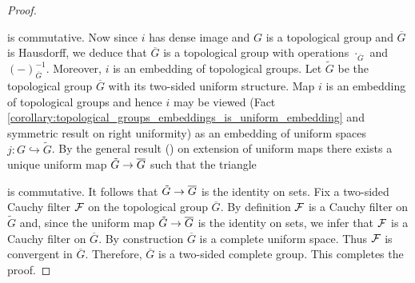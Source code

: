 \documentclass[10pt]{amsart}
\begin{document}
\begin{proof}
\begin{center}
	\end{center}
	is commutative. Now since $i$ has dense image and $G$ is a topological group and $\overline{G}$ is Hausdorff, we deduce that $\overline{G}$ is a topological group with operations $\cdot_{\overline{G}}$ and $(-)^{-1}_{\overline{G}}$. Moreover, $i$ is an embedding of topological groups. Let $\tilde{G}$ be the topological group $\overline{G}$ with its two-sided uniform structure. Map $i$ is an embedding of topological groups and hence $i$ may be viewed (Fact \ref{corollary:topological_groups_embeddings_is_uniform_embedding} and symmetric result on right uniformity) as an embedding of uniform spaces $j:G\hookrightarrow \tilde{G}$. By the general result (\cite{Uniform_Spaces}) on extension of uniform maps there exists a unique uniform map $\tilde{G} \rightarrow \overline{G}$ such that the triangle
	\begin{center}
	\end{center}
	is commutative. It follows that $\tilde{G} \rightarrow \overline{G}$ is the identity on sets. Fix a two-sided Cauchy filter ${\mathcal F}$ on the topological group $\overline{G}$. By definition ${\mathcal F}$ is a Cauchy filter on $\tilde{G}$ and, since the uniform map $\tilde{G}\rightarrow \overline{G}$ is the identity on sets, we infer that ${\mathcal F}$ is a Cauchy filter on $\overline{G}$. By construction $\overline{G}$ is a complete uniform space. Thus ${\mathcal F}$ is convergent in $\overline{G}$. Therefore, $\overline{G}$ is a two-sided complete group. This completes the proof.
\end{proof}





















\small


\end{document}
